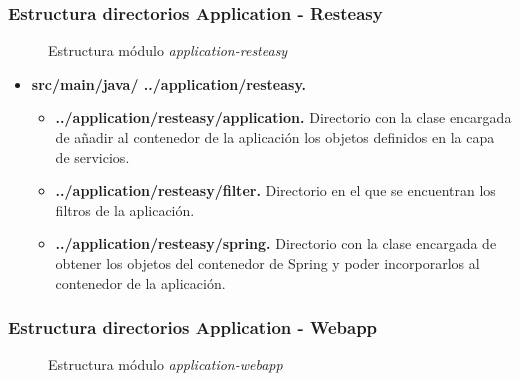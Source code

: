 \subsubsection*{Estructura directorios Application - Resteasy}
\begin{figure}[H]
\centering
{}
\caption{Estructura módulo \textit{application-resteasy}}
\end{figure}

\begin{itemize}
	\item \textbf{src/main/java/ ../application/resteasy. }
	\begin{itemize}
		\item \textbf{../application/resteasy/application. }Directorio con la clase encargada de añadir al contenedor de la aplicación los objetos definidos en la capa de servicios.		
		\item \textbf{../application/resteasy/filter. }Directorio en el que se encuentran los filtros de la aplicación.
		\item \textbf{../application/resteasy/spring. }Directorio con la clase encargada de obtener los objetos del contenedor de Spring y poder incorporarlos al contenedor de la aplicación.
	\end{itemize}
\end{itemize}



\subsubsection*{Estructura directorios Application - Webapp}
\begin{figure}[H]
\centering
{}
\caption{Estructura módulo \textit{application-webapp}}
\end{figure}

